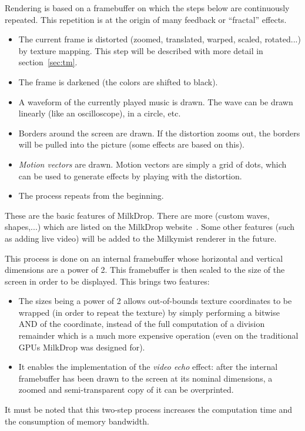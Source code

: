 \documentclass[a4paper,11pt]{kthesis}
\begin{document}
Rendering is based on a framebuffer on which the steps below are continuously repeated. This repetition is at the origin of many feedback or ``fractal'' effects.
\begin{itemize}
\item The current frame is distorted (zoomed, translated, warped, scaled, rotated...) by texture mapping. This step will be described with more detail in section~\ref{sec:tm}.
\item The frame is darkened (the colors are shifted to black).
\item A waveform of the currently played music is drawn. The wave can be drawn linearly (like an oscilloscope), in a circle, etc.
\item Borders around the screen are drawn. If the distortion zooms out, the borders will be pulled into the picture (some effects are based on this).
\item \textit{Motion vectors} are drawn. Motion vectors are simply a grid of dots, which can be used to generate effects by playing with the distortion.
\item The process repeats from the beginning.
\end{itemize}

These are the basic features of MilkDrop. There are more (custom waves, shapes,...) which are listed on the MilkDrop website~\cite{milkdrop}. Some other features (such as adding live video) will be added to the Milkymist renderer in the future.

This process is done on an internal framebuffer whose horizontal and vertical dimensions are a power of 2. This framebuffer is then scaled to the size of the screen in order to be displayed. This brings two features:
\begin{itemize}
\item The sizes being a power of 2 allows out-of-bounds texture coordinates to be wrapped (in order to repeat the texture) by simply performing a bitwise AND of the coordinate, instead of the full computation of a division remainder which is a much more expensive operation (even on the traditional GPUs MilkDrop was designed for).
\item It enables the implementation of the \textit{video echo} effect: after the internal framebuffer has been drawn to the screen at its nominal dimensions, a zoomed and semi-transparent copy of it can be overprinted.
\end{itemize}
It must be noted that this two-step process increases the computation time and the consumption of memory bandwidth.
\end{document}
